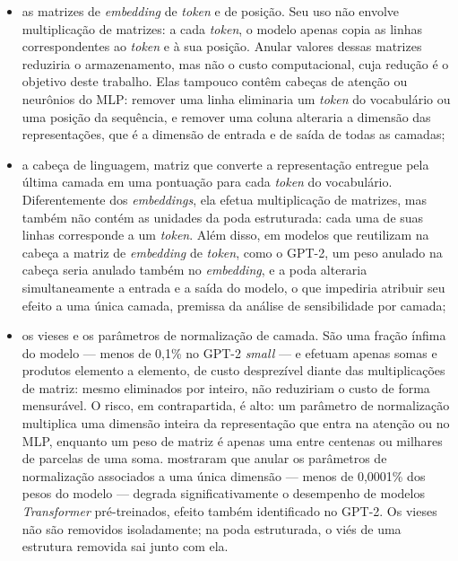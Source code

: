 \begin{itemize}
    \item as matrizes de \textit{embedding} de \textit{token} e de posição.
          Seu uso não envolve multiplicação de matrizes: a
          cada \textit{token}, o modelo apenas copia as linhas correspondentes ao
          \textit{token} e à sua posição. Anular valores dessas matrizes reduziria o
          armazenamento, mas não o custo computacional, cuja redução é o objetivo deste
          trabalho. Elas tampouco contêm cabeças de atenção ou neurônios do MLP: remover
          uma linha eliminaria um \textit{token} do vocabulário ou uma posição da
          sequência, e remover uma coluna alteraria a dimensão das representações, que é a
          dimensão de entrada e de saída de todas as camadas;
    \item a cabeça de linguagem, matriz que converte a representação entregue pela última
          camada em uma pontuação para cada \textit{token} do vocabulário. Diferentemente
          dos \textit{embeddings}, ela efetua multiplicação de matrizes, mas também não
          contém as unidades da poda estruturada: cada uma de suas linhas corresponde a um
          \textit{token}. Além disso, em modelos que reutilizam na cabeça a matriz de
          \textit{embedding} de \textit{token}, como o GPT-2, um peso anulado na cabeça
          seria anulado também no \textit{embedding}, e a poda alteraria simultaneamente a
          entrada e a saída do modelo, o que impediria atribuir seu efeito a uma única
          camada, premissa da análise de sensibilidade por camada;
    \item os vieses e os parâmetros de normalização de camada. São uma fração ínfima do
          modelo --- menos de 0,1\% no GPT-2 \textit{small} --- e efetuam apenas somas e
          produtos elemento a elemento, de custo desprezível diante das multiplicações de
          matriz: mesmo eliminados por inteiro, não reduziriam o custo de forma
          mensurável. O risco, em contrapartida, é alto: um parâmetro de normalização
          multiplica uma dimensão inteira da representação que entra na atenção ou no MLP,
          enquanto um peso de matriz é apenas uma entre centenas ou milhares de parcelas de
          uma soma.  mostraram que anular os parâmetros de
          normalização associados a uma única dimensão --- menos de 0,0001\% dos pesos do
          modelo --- degrada significativamente o desempenho de modelos
          \textit{Transformer} pré-treinados, efeito também identificado no GPT-2. Os
          vieses não são removidos isoladamente; na poda estruturada, o viés de uma
          estrutura removida sai junto com ela.
\end{itemize}

